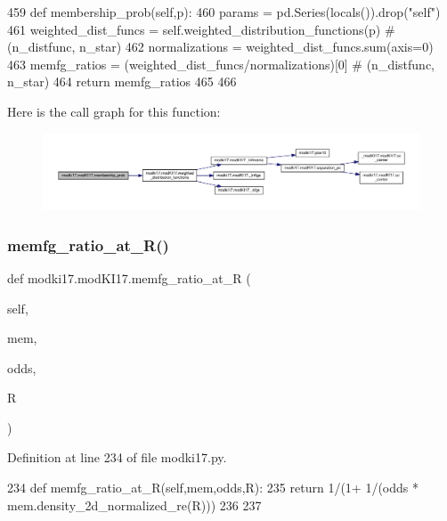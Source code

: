 \begin{DoxyCode}
459     \textcolor{keyword}{def }membership\_prob(self,p):
460         params = pd.Series(locals()).drop(\textcolor{stringliteral}{"self"})
461         weighted\_dist\_funcs = self.weighted\_distribution\_functions(p)  \textcolor{comment}{# (n\_distfunc, n\_star)}
462         normalizations = weighted\_dist\_funcs.sum(axis=0)
463         memfg\_ratios = (weighted\_dist\_funcs/normalizations)[0]  \textcolor{comment}{# (n\_distfunc, n\_star)}
464         \textcolor{keywordflow}{return} memfg\_ratios
465 
466     
\end{DoxyCode}
Here is the call graph for this function\+:\nopagebreak
\begin{figure}[H]
\begin{center}
\leavevmode
\includegraphics[width=350pt]{df/da3/classmodki17_1_1modKI17_acfc9325282029b80be3c61c03d64c5cd_cgraph}
\end{center}
\end{figure}
\mbox{\label{classmodki17_1_1modKI17_a11ebae41e739d4bd72a9bea0de3a07b8}} 
\subsubsection{\texorpdfstring{memfg\+\_\+ratio\+\_\+at\+\_\+\+R()}{memfg\_ratio\_at\_R()}}
{\footnotesize\ttfamily def modki17.\+mod\+K\+I17.\+memfg\+\_\+ratio\+\_\+at\+\_\+R (\begin{DoxyParamCaption}\item[{}]{self,  }\item[{}]{mem,  }\item[{}]{odds,  }\item[{}]{R }\end{DoxyParamCaption})}



Definition at line 234 of file modki17.\+py.


\begin{DoxyCode}
234     \textcolor{keyword}{def }memfg\_ratio\_at\_R(self,mem,odds,R):
235         \textcolor{keywordflow}{return} 1/(1+ 1/(odds * mem.density\_2d\_normalized\_re(R)))
236 
237     
\end{DoxyCode}
\mbox{\label{classmodki17_1_1modKI17_a687b651ec8a403632770afcf8a38792d}} 
